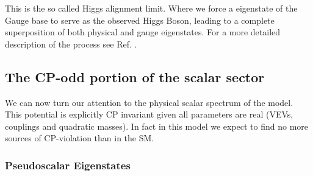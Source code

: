 This is the so called Higgs alignment limit. Where we force a eigenstate of the Gauge base to serve as the observed Higgs Boson, leading to a complete superposition of both physical and gauge eigenstates. For a more detailed description of the process see Ref. \cite{Ian_Thesis}. 

\subsection{The CP-odd portion of the scalar sector}

We can now turn our attention to the physical scalar spectrum of the model. 
%
This potential is explicitly CP invariant given all parameters are real (VEVs, couplings and quadratic masses). In fact in this model we expect to find no more sources of CP-violation than in the SM.

\subsubsection{Pseudoscalar Eigenstates}

